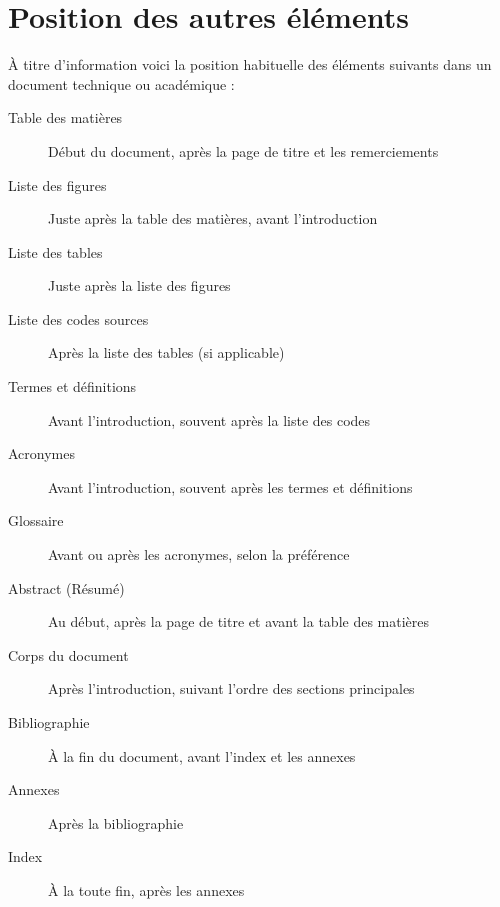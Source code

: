 

\section{Position des autres éléments}

À titre d'information voici la position habituelle des éléments suivants dans un document technique ou académique :

\begin{description}
    \item[Table des matières] Début du document, après la page de titre et les remerciements
    \item[Liste des figures] Juste après la table des matières, avant l'introduction
    \item[Liste des tables] Juste après la liste des figures
    \item[Liste des codes sources] Après la liste des tables (si applicable)
    \item[Termes et définitions] Avant l'introduction, souvent après la liste des codes
    \item[Acronymes] Avant l'introduction, souvent après les termes et définitions
    \item[Glossaire] Avant ou après les acronymes, selon la préférence
    \item[Abstract (Résumé)] Au début, après la page de titre et avant la table des matières
    \item[Corps du document] Après l'introduction, suivant l'ordre des sections principales
    \item[Bibliographie] À la fin du document, avant l'index et les annexes
    \item[Annexes] Après la bibliographie
    \item[Index] À la toute fin, après les annexes
\end{description}